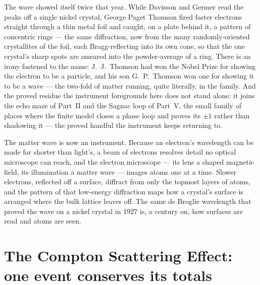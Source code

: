 The wave showed itself twice that year. While Davisson and Germer read the peaks off a single nickel crystal,
George Paget Thomson fired faster electrons straight through a thin metal foil and caught, on a plate behind
it, a pattern of concentric rings --- the same diffraction, now from the many randomly-oriented crystallites of
the foil, each Bragg-reflecting into its own cone, so that the one crystal's sharp spots are smeared into the
powder-average of a ring. There is an irony fastened to the name: J.~J.~Thomson had won the Nobel Prize for
showing the electron to be a particle, and his son G.~P.~Thomson won one for showing it to be a wave --- the
two-fold of matter running, quite literally, in the family. And the proved residue the instrument foregrounds here
does not stand alone: it joins the echo maze of Part~II and the Sagnac loop of Part~V, the small family of
places where the finite model closes a phase loop and proves its $\pm 1$ rather than shadowing it --- the
proved handful the instrument keeps returning to.

The matter wave is now an instrument. Because an electron's wavelength can be made far shorter than light's, a
beam of electrons resolves detail no optical microscope can reach, and the electron microscope --- its lens a
shaped magnetic field, its illumination a matter wave --- images atoms one at a time. Slower electrons,
reflected off a surface, diffract from only the topmost layers of atoms, and the pattern of that low-energy
diffraction maps how a crystal's surface is arranged where the bulk lattice leaves off. The same de Broglie
wavelength that proved the wave on a nickel crystal in 1927 is, a century on, how surfaces are read and atoms
are seen.

\section{The Compton Scattering Effect: one event conserves its totals}
\label{se:compton}

